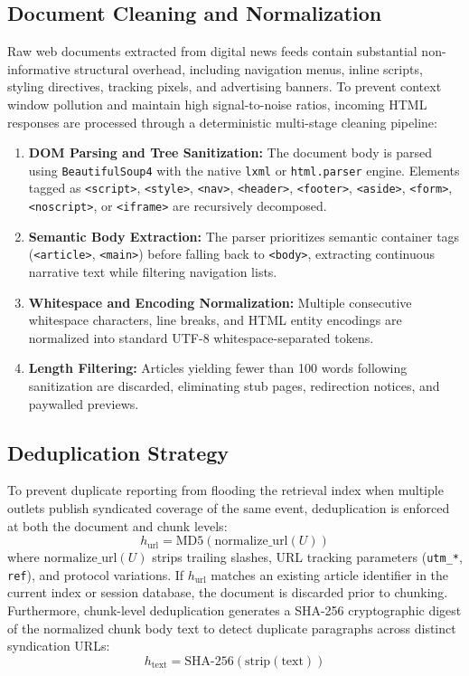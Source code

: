 \subsection{Document Cleaning and Normalization}
Raw web documents extracted from digital news feeds contain substantial non-informative structural overhead, including navigation menus, inline scripts, styling directives, tracking pixels, and advertising banners. To prevent context window pollution and maintain high signal-to-noise ratios, incoming HTML responses are processed through a deterministic multi-stage cleaning pipeline:
\begin{enumerate}
    \item \textbf{DOM Parsing and Tree Sanitization:} The document body is parsed using \texttt{BeautifulSoup4} with the native \texttt{lxml} or \texttt{html.parser} engine. Elements tagged as \texttt{<script>}, \texttt{<style>}, \texttt{<nav>}, \texttt{<header>}, \texttt{<footer>}, \texttt{<aside>}, \texttt{<form>}, \texttt{<noscript>}, or \texttt{<iframe>} are recursively decomposed.
    \item \textbf{Semantic Body Extraction:} The parser prioritizes semantic container tags (\texttt{<article>}, \texttt{<main>}) before falling back to \texttt{<body>}, extracting continuous narrative text while filtering navigation lists.
    \item \textbf{Whitespace and Encoding Normalization:} Multiple consecutive whitespace characters, line breaks, and HTML entity encodings are normalized into standard UTF-8 whitespace-separated tokens.
    \item \textbf{Length Filtering:} Articles yielding fewer than 100 words following sanitization are discarded, eliminating stub pages, redirection notices, and paywalled previews.
\end{enumerate}

\subsection{Deduplication Strategy}
To prevent duplicate reporting from flooding the retrieval index when multiple outlets publish syndicated coverage of the same event, deduplication is enforced at both the document and chunk levels:
\begin{equation}
\label{eq:url_hash}
h_{\text{url}} = \text{MD5}(\text{normalize\_url}(U))
\end{equation}
where $\text{normalize\_url}(U)$ strips trailing slashes, URL tracking parameters (\texttt{utm\_*}, \texttt{ref}), and protocol variations. If $h_{\text{url}}$ matches an existing article identifier in the current index or session database, the document is discarded prior to chunking. Furthermore, chunk-level deduplication generates a SHA-256 cryptographic digest of the normalized chunk body text to detect duplicate paragraphs across distinct syndication URLs:
\begin{equation}
\label{eq:text_hash}
h_{\text{text}} = \text{SHA-256}(\text{strip}(\text{text}))
\end{equation}

